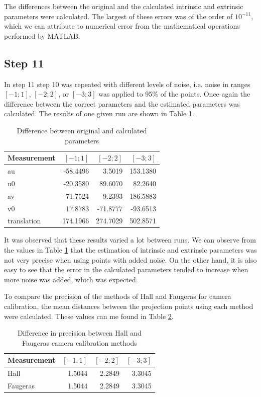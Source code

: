 \documentclass[journal]{IEEEtran}
\begin{document}
The differences between the original and the calculated intrinsic and extrinsic parameters were calculated. The largest of these errors was of the order of $10^{-11}$, which we can attribute to numerical error from the mathematical operations performed by MATLAB.


\subsection{Step 11}

In step 11 step 10 was repeated with different levels of noise, i.e. noise in ranges $[-1;1]$, $[-2;2]$, or $[-3;3]$ was applied to 95\% of the points. Once again the difference between the correct parameters and the estimated parameters was calculated. The results of one given run are shown in Table \ref{matata}.

\begin{table}[H]
	\caption{Difference between original and calculated parameters}
	\centering
	\begin{tabular}{l | r r r}\label{matata}
		Measurement & $[-1;1]$ & $[-2;2]$ & $[-3;3]$ \\
		\hline
		au & -58.4496 & 3.5019 & 153.1380 \\
		u0 & -20.3580 & 89.6070 & 82.2640 \\
		av & -71.7524 & 9.2393 & 186.5883 \\
		v0 & 17.8783 & -71.8777 & -93.6513 \\
		translation & 174.1966 & 274.7029 & 502.8571 \\
	\end{tabular}
\end{table}

It was observed that these results varied a lot between runs. We can observe from the values in Table \ref{matata} that the estimation of intrinsic and extrinsic parameters was not very precise when using points with added noise. On the other hand, it is also easy to see that the error in the calculated parameters tended to increase when more noise was added, which was expected.

To compare the precision of the methods of Hall and Faugeras for camera calibration, the mean distances between the projection points using each method were calculated. These values can me found in Table \ref{noworries}.

\begin{table}[H]
	\caption{Difference in precision between Hall and Faugeras camera calibration methods}
	\centering
	\begin{tabular}{l | r r r}\label{noworries}
		Measurement & $[-1;1]$ & $[-2;2]$ & $[-3;3]$ \\
		\hline
		Hall & 1.5044 & 2.2849 & 3.3045 \\
		Faugeras & 1.5044 & 2.2849 & 3.3045 \\
	\end{tabular}
\end{table}
\end{document}
